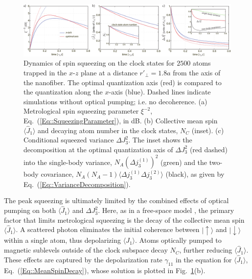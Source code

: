 \documentclass[preprint, aps,pra,onecolumn]{revtex4-1} %
\def\ket#1{\lvert{#1}\rangle}%
\newcommand{\erf}[1]{Eq.~(\ref{#1})}
\newcommand{\frf}[1]{Fig.~\ref{#1}}
\newcommand{\expt}[1]{\langle{#1}\rangle}
\newcommand{\expect}[1]{\big\langle #1 \big\rangle}
\newcommand{\varz}{\Delta J_3^2}
\newcommand{\jx}{\hat{J}_1}
\begin{document}
\begin{figure}[t]
\includegraphics[scale=0.42]{./Fig4}
\caption{Dynamics of spin squeezing on the clock states for $2500$ atoms trapped in the $x$-$z$ plane at a distance $ r'\!_\perp=1.8a$ from the axis of the nanofiber. 
The optimal quantization axis (red) is compared to the quantization along the $x$-axis (blue). 
Dashed lines indicate simulations without optical pumping; i.e. no decoherence. 
(a) Metrological spin squeezing parameter $\xi^{-2}$, \erf{Eq::SqueezingParameter}, in dB. 
(b) Collective mean spin $\expt{\hat{J}_1}$ and decaying atom number in the clock states, $N_C$ (inset).
(c) Conditional squeezed variance $\varz$. 
The inset shows the decomposition at the optimal quantization axis of $ \Delta J_3^2 $ (red dashed) into the single-body variance, $N_A (\Delta j_3^{(1)})^2$ (green) and the two-body covariance, $N_A(N_A-1)\expect{\Delta j_3^{(1)}\Delta j_3^{(2)}}$ (black), as given by \erf{Eq::VarianceDecomposition}.
}\label{Fig::Squeezing_Dynamics}
\end{figure}


The peak squeezing is ultimately limited by the combined effects of optical pumping on both $\expt{\jx}$ and $\varz$.  Here, as in a free-space model \cite{baragiola_three-dimensional_2014}, the primary factor that limits metrological squeezing is the decay of the collective mean spin $\expt{\jx}$. 
A scattered photon eliminates the initial coherence between $\ket{\uparrow}$ and $\ket{\downarrow}$ within a single atom, thus depolarizing $\expt{\jx}$.  
Atoms optically pumped to magnetic sublevels outside of the clock subspace decay $N_C$, further reducing $\expt{\jx}$. 
These effects are captured by the depolarization rate $\gamma_{11}$ in the equation for $\expt{\jx}$, \erf{Eq::MeanSpinDecay}, whose solution is plotted in \frf{Fig::Squeezing_Dynamics}(b).
  
\end{document}
